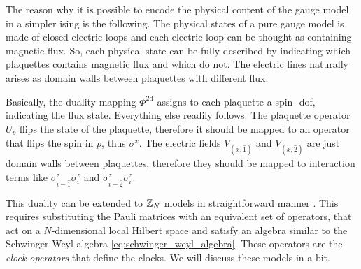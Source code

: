 The reason why it is possible to encode the physical content of the gauge model in a simpler \ac{ising} is the following.
The physical states of a pure gauge model is made of closed electric loops and each electric loop can be thought as containing magnetic flux.
So, each physical state can be fully described by indicating which plaquettes contains magnetic flux and which do not.
The electric lines naturally arises as domain walls between plaquettes with different flux.

Basically, the duality mapping $\Phi^{\text{2d}}$ assigns to each plaquette a spin-\onehalf{} \ac{dof}, indicating the flux state.
Everything else readily follows.
The plaquette operator $U_p$ flips the state of the plaquette, therefore it should be mapped to an operator that flips the spin in $p$, thus $\sigma^x$.
The electric fields $V_{(x, \hat{1})}$ and $V_{(x, \hat{2})}$ are just domain walls between plaquettes, therefore they should be mapped to interaction terms like $\sigma^z_{i-\hat{1}} \sigma^z_{i}$ and $\sigma^z_{i-\hat{2}} \sigma^z_i$.


This duality can be extended to $\mathbb{Z}_N$ models in straightforward manner \cite{radicevic2019spin}.
This requires substituting the Pauli matrices with an equivalent set of operators, that act on a $N$-dimensional local Hilbert space and satisfy an algebra similar to the Schwinger-Weyl algebra \eqref{eq:schwinger_weyl_algebra}.
These operators are the \emph{clock operators} that define the \aclp{clock}.
We will discuss these models in a bit.

